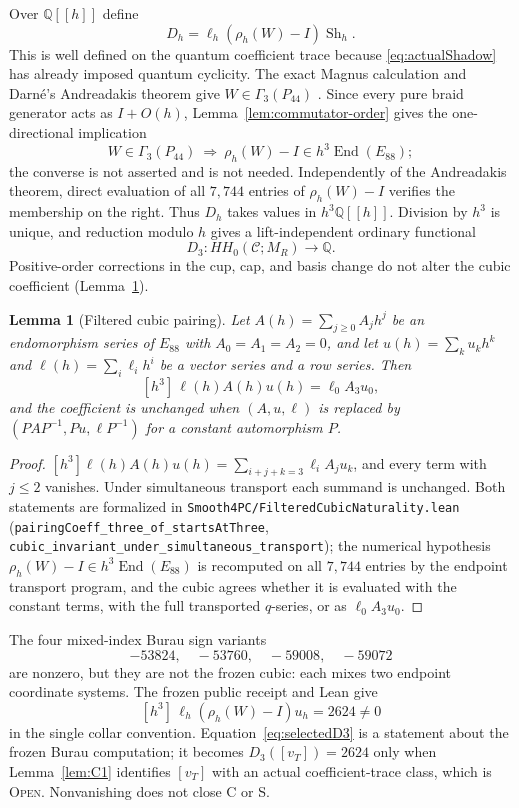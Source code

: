\documentclass[11pt]{amsart}
\newtheorem{lemma}[theorem]{Lemma}
\theoremstyle{definition}
\theoremstyle{remark}
\newcommand{\Q}{\mathbb{Q}}
\newcommand{\Open}{\textnormal{\textsc{Open}}}
\begin{document}
Over $\Q[[h]]$ define
\[
D_h=\ell_h(\rho_h(W)-I)\operatorname{Sh}_h.
\]
This is well defined on the quantum coefficient trace because
\eqref{eq:actualShadow} has already imposed quantum cyclicity.  The exact
Magnus calculation and Darn\'e's Andreadakis theorem give
$W\in\Gamma_3(P_{44})$ \cite[Theorem~6.2]{Darne2021}.  Since every pure
braid generator acts as $I+O(h)$, Lemma~\ref{lem:commutator-order} gives the
one-directional implication
\[
W\in\Gamma_3(P_{44})\ \Longrightarrow\
\rho_h(W)-I\in h^3\operatorname{End}(E_{88});
\]
the converse is not asserted and is not needed.  Independently of the
Andreadakis theorem, direct evaluation of all $7{,}744$ entries of
$\rho_h(W)-I$ verifies the membership on the right.
Thus $D_h$ takes values in $h^3\Q[[h]]$.  Division by $h^3$ is unique, and
reduction modulo $h$ gives a lift-independent ordinary functional
\[
D_3:HH_0(\mathcal C;M_R)\longrightarrow\Q.
\]
Positive-order corrections in the cup, cap, and basis change do not alter
the cubic coefficient (Lemma~\ref{lem:filtered-cubic}).

\begin{lemma}[Filtered cubic pairing]\label{lem:filtered-cubic}
Let $A(h)=\sum_{j\ge0}A_jh^j$ be an endomorphism series of $E_{88}$ with
$A_0=A_1=A_2=0$, and let $u(h)=\sum_k u_kh^k$ and
$\ell(h)=\sum_i\ell_ih^i$ be a vector series and a row series.  Then
\[
[h^3]\,\ell(h)A(h)u(h)=\ell_0A_3u_0,
\]
and the coefficient is unchanged when $(A,u,\ell)$ is replaced by
$(PAP^{-1},Pu,\ell P^{-1})$ for a constant automorphism $P$.
\end{lemma}

\begin{proof}
$[h^3]\ell(h)A(h)u(h)=\sum_{i+j+k=3}\ell_iA_ju_k$, and every term with
$j\le2$ vanishes.  Under simultaneous transport each summand is unchanged.
Both statements are formalized in
\texttt{Smooth4PC/FilteredCubicNaturality.lean}
(\texttt{pairingCoeff\_three\_of\_startsAtThree},
\texttt{cubic\_invariant\_under\_simultaneous\_transport}); the numerical
hypothesis $\rho_h(W)-I\in h^3\operatorname{End}(E_{88})$ is recomputed on
all $7{,}744$ entries by the endpoint transport program, and the cubic
agrees whether it is evaluated with the constant terms, with the full
transported $q$-series, or as $\ell_0A_3u_0$.
\end{proof}

The four mixed-index Burau sign variants
\[
-53824,\quad -53760,\quad -59008,\quad -59072
\]
are nonzero, but they are not the frozen cubic: each mixes two endpoint
coordinate systems.  The frozen public receipt and Lean give
\begin{equation}\label{eq:selectedD3}
[h^3]\,\ell_h(\rho_h(W)-I)u_h=2624\ne0
\end{equation}
in the single collar convention.  Equation~\eqref{eq:selectedD3} is a
statement about the frozen Burau computation; it becomes
$D_3([v_T])=2624$ only when Lemma~\ref{lem:C1} identifies $[v_T]$ with an
actual coefficient-trace class, which is \Open.  Nonvanishing does not
close C or S.
\end{document}
